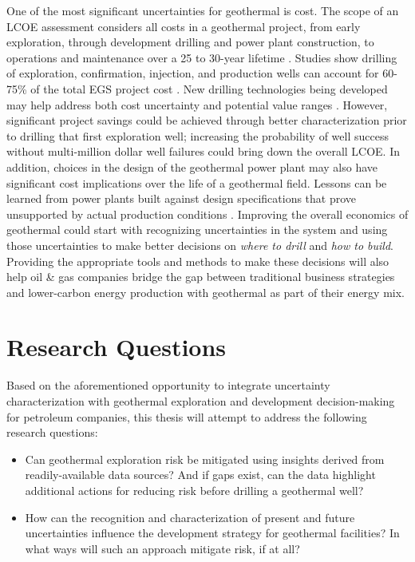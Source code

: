 One of the most significant uncertainties for geothermal is cost. The scope of an LCOE assessment considers all costs in a geothermal project, from early exploration, through development drilling and power plant construction, to operations and maintenance over a 25 to 30-year lifetime \citep{beckers_introducing_2013, entingh_volume_2006, tester_economic_1990}. Studies show drilling of exploration, confirmation, injection, and production wells can account for 60-75\% of the total EGS project cost \citep{lukawski_uncertainty_2016, petty_synergies_2009}. New drilling technologies being developed may help address both cost uncertainty and potential value ranges \citep{nrel_2020_2020}. However, significant project savings could be achieved through better characterization prior to drilling that first exploration well; increasing the probability of well success without multi-million dollar well failures could bring down the overall LCOE. In addition, choices in the design of the geothermal power plant may also have significant cost implications over the life of a geothermal field. Lessons can be learned from power plants built against design specifications that prove unsupported by actual production conditions \citep{manente_hybrid_2011}. Improving the overall economics of geothermal could start with recognizing uncertainties in the system and using those uncertainties to make better decisions on \textit{where to drill} and \textit{how to build}. Providing the appropriate tools and methods to make these decisions will also help oil \& gas companies bridge the gap between traditional business strategies and lower-carbon energy production with geothermal as part of their energy mix.

\section{Research Questions}\label{ch1:researchqs}
Based on the aforementioned opportunity to integrate uncertainty characterization with geothermal exploration and development decision-making for petroleum companies, this thesis will attempt to address the following research questions:

\begin{itemize}
  \item Can geothermal exploration risk be mitigated using insights derived from readily-available data sources? And if gaps exist, can the data highlight additional actions for reducing risk before drilling a geothermal well?
  \item How can the recognition and characterization of present and future uncertainties influence the development strategy for geothermal facilities? In what ways will such an approach mitigate risk, if at all?
\end{itemize}

